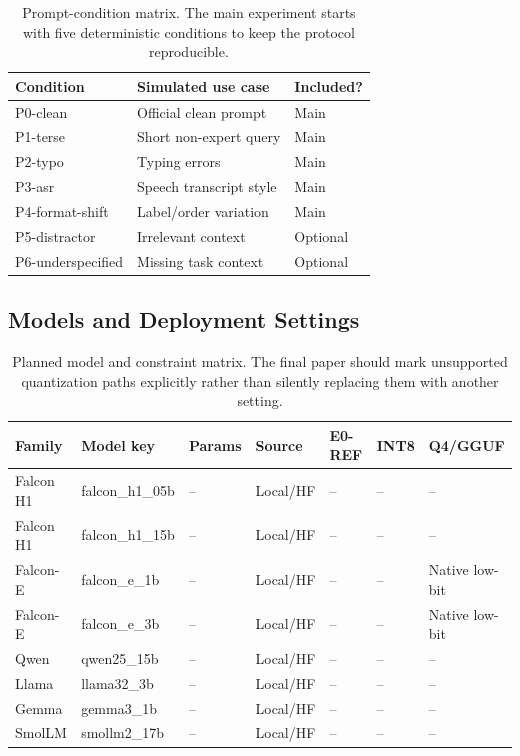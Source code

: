 \documentclass[letterpaper]{article}
\newcommand{\clean}{P0-clean}
\newcommand{\terse}{P1-terse}
\newcommand{\typo}{P2-typo}
\newcommand{\asr}{P3-asr}
\newcommand{\formatshift}{P4-format-shift}
\newcommand{\tbd}{--}
\begin{document}
\begin{table}[t]
\centering
\small
\begin{tabular}{lll}
\toprule
Condition & Simulated use case & Included? \\
\midrule
\clean & Official clean prompt & Main \\
\terse & Short non-expert query & Main \\
\typo & Typing errors & Main \\
\asr & Speech transcript style & Main \\
\formatshift & Label/order variation & Main \\
P5-distractor & Irrelevant context & Optional \\
P6-underspecified & Missing task context & Optional \\
\bottomrule
\end{tabular}
\caption{Prompt-condition matrix. The main experiment starts with five deterministic conditions to keep the protocol reproducible.}
\label{tab:prompt_conditions}
\end{table}

\subsection{Models and Deployment Settings}

\begin{table}[t]
\centering
\small
\begin{tabular}{lllllll}
\toprule
Family & Model key & Params & Source & E0-REF & INT8 & Q4/GGUF \\
\midrule
Falcon H1 & falcon\_h1\_05b & \tbd & Local/HF & \tbd & \tbd & \tbd \\
Falcon H1 & falcon\_h1\_15b & \tbd & Local/HF & \tbd & \tbd & \tbd \\
Falcon-E & falcon\_e\_1b & \tbd & Local/HF & \tbd & \tbd & Native low-bit \\
Falcon-E & falcon\_e\_3b & \tbd & Local/HF & \tbd & \tbd & Native low-bit \\
Qwen & qwen25\_15b & \tbd & Local/HF & \tbd & \tbd & \tbd \\
Llama & llama32\_3b & \tbd & Local/HF & \tbd & \tbd & \tbd \\
Gemma & gemma3\_1b & \tbd & Local/HF & \tbd & \tbd & \tbd \\
SmolLM & smollm2\_17b & \tbd & Local/HF & \tbd & \tbd & \tbd \\
\bottomrule
\end{tabular}
\caption{Planned model and constraint matrix. The final paper should mark unsupported quantization paths explicitly rather than silently replacing them with another setting.}
\label{tab:model_matrix}
\end{table}
\end{document}
